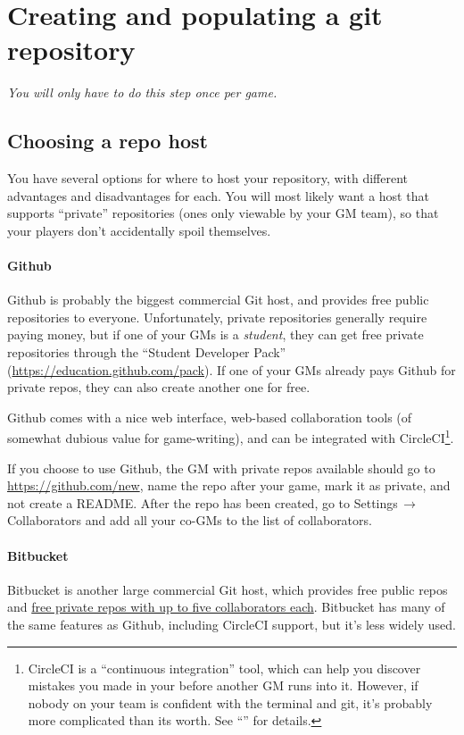 \documentclass[green]{testgame}
\begin{document}
\section{Creating and populating a git repository}

{\em You will only have to do this step once per game.}

\subsection{Choosing a repo host}

You have several options for where to host your repository, with different advantages and disadvantages for each. You will most likely want a host that supports ``private'' repositories (ones only viewable by your GM team), so that your players don't accidentally spoil themselves.

\paragraph*{Github} Github is probably the biggest commercial Git host, and provides free public repositories to everyone. Unfortunately, private repositories generally require paying money, but if one of your GMs is a \emph{student}, they can get free private repositories through the ``Student Developer Pack'' (\url{https://education.github.com/pack}). If one of your GMs already pays Github for private repos, they can also create another one for free.

Github comes with a nice web interface, web-based collaboration tools (of somewhat dubious value for game-writing), and can be integrated with CircleCI\footnote{CircleCI is a ``continuous integration'' tool, which can help you discover mistakes you made in your \gametex{} before another GM runs into it. However, if nobody on your team is confident with the terminal and git, it's probably more complicated than its worth. See ``\gCI{}'' for details. }.

If you choose to use Github, the GM with private repos available should go to \url{https://github.com/new}, name the repo after your game, mark it as private, and not create a README. After the repo has been created, go to Settings$\,\to\,$Collaborators and add all your co-GMs to the list of collaborators.

\paragraph*{Bitbucket} Bitbucket is another large commercial Git host, which provides free public repos and \href{https://bitbucket.org/product/pricing/}{free private repos with up to five collaborators each}. Bitbucket has many of the same features as Github, including CircleCI support, but it's less widely used.
\end{document}
